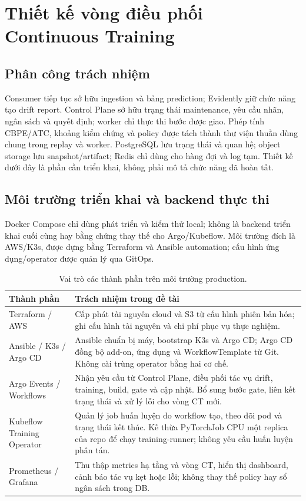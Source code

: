 \section{Thiết kế vòng điều phối Continuous Training}
\label{sec:orchestration}
\subsection{Phân công trách nhiệm}
Consumer tiếp tục sở hữu ingestion và bảng prediction; Evidently giữ chức năng tạo drift report. Control Plane sở hữu trạng thái maintenance, yêu cầu nhãn, ngân sách và quyết định; worker chỉ thực thi bước được giao. Phép tính CBPE/ATC, khoảng kiểm chứng và policy được tách thành thư viện thuần dùng chung trong replay và worker. PostgreSQL lưu trạng thái và quan hệ; object storage lưu snapshot/artifact; Redis chỉ dùng cho hàng đợi và log tạm. Thiết kế dưới đây là phần cần triển khai, không phải mô tả chức năng đã hoàn tất.

\subsection{Môi trường triển khai và backend thực thi}
\label{sec:runtime}
Docker Compose chỉ dùng phát triển và kiểm thử local; không là backend triển khai cuối cùng hay bằng chứng thay thế cho Argo/Kubeflow. Môi trường đích là AWS/K3s, được dựng bằng Terraform và Ansible automation; cấu hình ứng dụng/operator được quản lý qua GitOps.

\begin{table}[ht]
\centering
\caption{Vai trò các thành phần trên môi trường production.}\label{tab:runtime}
\begin{tabularx}{\linewidth}{@{}L{3.6cm} Y@{}}
\toprule\textbf{Thành phần} & \textbf{Trách nhiệm trong đề tài} \\
\midrule
Terraform / AWS & Cấp phát tài nguyên cloud và S3 từ cấu hình phiên bản hóa; ghi cấu hình tài nguyên và chi phí phục vụ thực nghiệm. \\
Ansible / K3s / Argo CD & Ansible chuẩn bị máy, bootstrap K3s và Argo CD; Argo CD đồng bộ add-on, ứng dụng và WorkflowTemplate từ Git. Không cài trùng operator bằng hai cơ chế. \\
Argo Events / Workflows & Nhận yêu cầu từ Control Plane, điều phối tác vụ drift, training, build, gate và cập nhật. Bổ sung bước gate, liên kết trạng thái và xử lý lỗi cho vòng CT mới. \\
Kubeflow Training Operator & Quản lý job huấn luyện do workflow tạo, theo dõi pod và trạng thái kết thúc. Kế thừa PyTorchJob CPU một replica của repo để chạy training-runner; không yêu cầu huấn luyện phân tán. \\
Prometheus / Grafana & Thu thập metrics hạ tầng và vòng CT, hiển thị dashboard, cảnh báo tác vụ kẹt hoặc lỗi; không thay thế policy hay sổ ngân sách trong DB. \\
\bottomrule
\end{tabularx}
\end{table}

